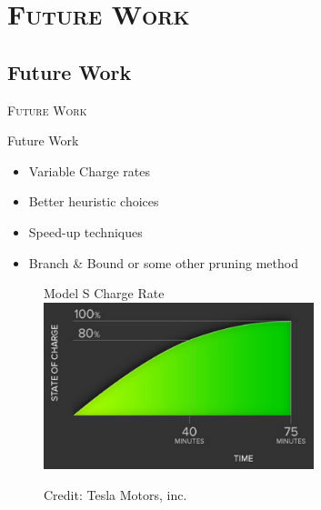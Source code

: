 \section{\scshape Future Work}
\subsection{Future Work}

\begin{frame}
\center \huge \scshape Future Work
\end{frame}

\begin{frame}{Future Work}
\begin{itemize}
\item Variable Charge rates
\item Better heuristic choices
\item Speed-up techniques
\item Branch \& Bound or some other pruning method
\end{itemize}
\begin{figure}[h!]
  \centering
  Model S Charge Rate
    \includegraphics[width=0.7\textwidth]{images/chargerate}
  
      \tiny Credit: Tesla Motors, inc.
\end{figure}
\vspace{10cm}
\end{frame}

